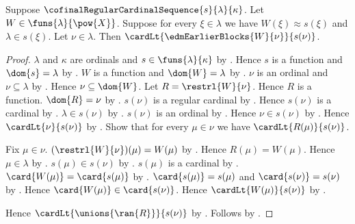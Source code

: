 \begin{theorem}\label{edm_earlier_blocks_small}
    Suppose $\cofinalRegularCardinalSequence{s}{\lambda}{\kappa}$.
    Let $W\in\funs{\lambda}{\pow{X}}$.
    Suppose for every $\xi\in\lambda$ we have
        $W(\xi)\approx s(\xi)$ and $\lambda\in s(\xi)$.
    Let $\nu\in\lambda$.
    Then $\cardLt{\edmEarlierBlocks{W}{\nu}}{s(\nu)}$.
\end{theorem}
\begin{proof}
    $\lambda$ and $\kappa$ are ordinals and
        $s\in\funs{\lambda}{\kappa}$ by
        .
    Hence $s$ is a function and $\dom{s}=\lambda$ by
        .
    $W$ is a function and $\dom{W}=\lambda$ by
        .
    $\nu$ is an ordinal and $\nu\subseteq\lambda$ by
        .
    Hence $\nu\subseteq\dom{W}$.
    Let $R=\restrl{W}{\nu}$.
    Hence $R$ is a function.
    $\dom{R}=\nu$ by
        .
    $s(\nu)$ is a regular cardinal by
        .
    Hence $s(\nu)$ is a cardinal by .
    $\lambda\in s(\nu)$ by \auto.
    $s(\nu)$ is an ordinal by
        .
    Hence $\nu\in s(\nu)$ by .
    Hence $\cardLt{\nu}{s(\nu)}$ by
        .
    Show that for every $\mu\in\nu$ we have
        $\cardLt{R(\mu)}{s(\nu)}$.
    \begin{subproof}
        Fix $\mu\in\nu$.
        $(\restrl{W}{\nu})(\mu)=W(\mu)$ by
            .
        Hence $R(\mu)=W(\mu)$.
        Hence $\mu\in\lambda$ by .
        $s(\mu)\in s(\nu)$ by
            .
        $s(\mu)$ is a cardinal by
            .
        $\card{W(\mu)}=\card{s(\mu)}$ by
            .
        $\card{s(\mu)}=s(\mu)$ and $\card{s(\nu)}=s(\nu)$ by
            .
        Hence $\card{W(\mu)}\in\card{s(\nu)}$.
        Hence $\cardLt{W(\mu)}{s(\nu)}$ by
            .
    \end{subproof}
    Hence $\cardLt{\unions{\ran{R}}}{s(\nu)}$ by
        .
    Follows by .
\end{proof}

